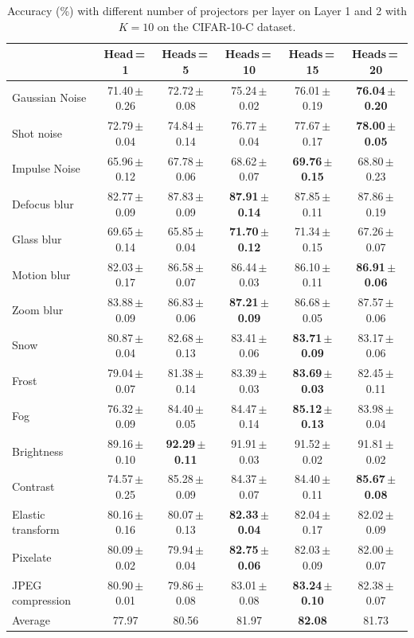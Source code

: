 \documentclass{article}
\newcommand{\ppm}{\,\scriptsize$\pm$}
\newcommand{\dorowcolors}{\rowcolors{2}{gray!15}{white}}
\begin{document}
\begin{table}[h!]
    \centering
    \begin{small}    
    \dorowcolors
    \begin{tabular}{l|ccccc}
    \toprule
        ~ & Head\,=\,1 & Heads\,=\,5 & Heads\,=\,10 & Heads\,=\,15 & Heads\,=\,20 \\ \midrule
        Gaussian Noise & 71.40\ppm0.26 & 72.72\ppm0.08 & 75.24\ppm0.02 & 76.01\ppm0.19 & \textbf{76.04\ppm0.20} \\ 
        Shot noise & 72.79\ppm0.04 & 74.84\ppm0.14 & 76.77\ppm0.04 & 77.67\ppm0.17 & \textbf{78.00\ppm0.05} \\ 
        Impulse Noise & 65.96\ppm0.12 & 67.78\ppm0.06 & 68.62\ppm0.07 & \textbf{69.76\ppm0.15} & 68.80\ppm0.23 \\ 
        Defocus blur & 82.77\ppm0.09 & 87.83\ppm0.09 & \textbf{87.91\ppm0.14} & 87.85\ppm0.11 & 87.86\ppm0.19 \\ 
        Glass blur & 69.65\ppm0.14 & 65.85\ppm0.04 & \textbf{71.70\ppm0.12} & 71.34\ppm0.15 & 67.26\ppm0.07 \\ 
        Motion blur & 82.03\ppm0.17 & 86.58\ppm0.07 & 86.44\ppm0.03 & 86.10\ppm0.11 & \textbf{86.91\ppm0.06} \\ 
        Zoom blur & 83.88\ppm0.09 & 86.83\ppm0.06 & \textbf{87.21\ppm0.09} & 86.68\ppm0.05 & 87.57\ppm0.06 \\ 
        Snow & 80.87\ppm0.04 & 82.68\ppm0.13 & 83.41\ppm0.06 & \textbf{83.71\ppm0.09} & 83.17\ppm0.06 \\ 
        Frost & 79.04\ppm0.07 & 81.38\ppm0.14 & 83.39\ppm0.03 & \textbf{83.69\ppm0.03} & 82.45\ppm0.11 \\ 
        Fog & 76.32\ppm0.09 & 84.40\ppm0.05 & 84.47\ppm0.14 & \textbf{85.12\ppm0.13} & 83.98\ppm0.04 \\ 
        Brightness & 89.16\ppm0.10 & \textbf{92.29\ppm0.11} & 91.91\ppm0.03 & 91.52\ppm0.02 & 91.81\ppm0.02 \\ 
        Contrast &  74.57\ppm0.25 & 85.28\ppm0.09 & 84.37\ppm0.07 & 84.40\ppm0.11 & \textbf{85.67\ppm0.08} \\ 
        Elastic transform & 80.16\ppm0.16 & 80.07\ppm0.13 & \textbf{82.33\ppm0.04} & 82.04\ppm0.17 & 82.02\ppm0.09 \\ 
        Pixelate & 80.09\ppm0.02 & 79.94\ppm0.04 & \textbf{82.75\ppm0.06} & 82.03\ppm0.09 & 82.00\ppm0.07 \\ 
        JPEG compression & 80.90\ppm0.01 & 79.86\ppm0.08 & 83.01\ppm0.08 & \textbf{83.24\ppm0.10} & 82.38\ppm0.07 \\ \midrule
        Average & 77.97 & 80.56 & 81.97 & \textbf{82.08} & 81.73 \\ 
        \bottomrule
    \end{tabular}
    \end{small}
    \caption{Accuracy (\%) with different number of projectors per layer on Layer 1 and 2 with $K\!=\!10$ on the CIFAR-10-C dataset.}
	\label{tab:HeadsComparison}
\end{table}
\end{document}
